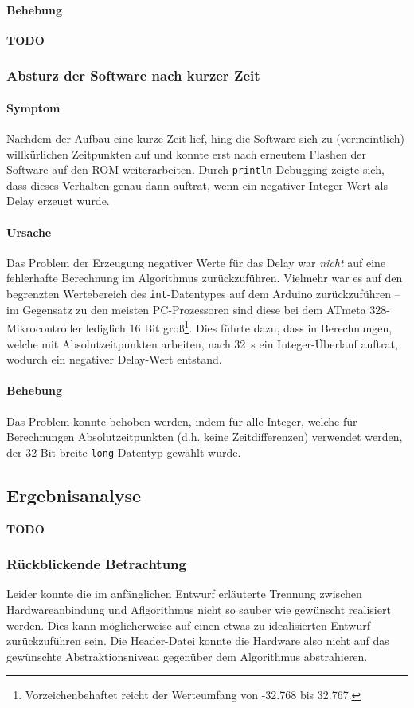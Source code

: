 \documentclass{kis}
\newcommand{\todo}{\textbf{TODO}}
\begin{document}
\paragraph{Behebung}
\todo

\subsubsection{Absturz der Software nach kurzer Zeit}
\paragraph{Symptom}
Nachdem der Aufbau eine kurze Zeit lief, hing die Software sich zu (vermeintlich) willkürlichen Zeitpunkten auf und konnte erst nach erneutem Flashen der Software auf den ROM weiterarbeiten. Durch \texttt{println}-Debugging zeigte sich, dass dieses Verhalten genau dann auftrat, wenn ein negativer Integer-Wert als Delay erzeugt wurde.

\paragraph{Ursache}
Das Problem der Erzeugung negativer Werte für das Delay war \emph{nicht} auf eine fehlerhafte Berechnung im Algorithmus zurückzuführen. Vielmehr war es auf den begrenzten Wertebereich des \texttt{int}-Datentypes auf dem Arduino zurückzuführen -- im Gegensatz zu den meisten PC-Prozessoren sind diese bei dem ATmeta 328-Mikrocontroller lediglich 16 Bit groß\footnote{Vorzeichenbehaftet reicht der Werteumfang von -32.768 bis 32.767.}. Dies führte dazu, dass in Berechnungen, welche mit Absolutzeitpunkten arbeiten, nach 32~s ein Integer-Überlauf auftrat, wodurch ein negativer Delay-Wert entstand.

\paragraph{Behebung}
Das Problem konnte behoben werden, indem für alle Integer, welche für Berechnungen Absolutzeitpunkten (d.h. keine Zeitdifferenzen) verwendet werden, der 32 Bit breite \texttt{long}-Datentyp gewählt wurde.

\subsection{Ergebnisanalyse}
\todo

\subsubsection{Rückblickende Betrachtung}
Leider konnte die im anfänglichen Entwurf erläuterte Trennung zwischen Hardwareanbindung und Aflgorithmus nicht so sauber wie gewünscht realisiert werden. Dies kann möglicherweise auf einen etwas zu idealisierten Entwurf zurückzuführen sein. Die Header-Datei konnte die Hardware also nicht auf das gewünschte Abstraktionsniveau gegenüber dem Algorithmus abstrahieren.

\appendix
\end{document}
